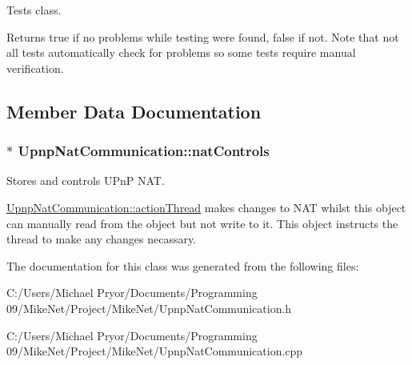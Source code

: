 Tests class. 

\begin{DoxyReturn}{Returns}
true if no problems while testing were found, false if not. Note that not all tests automatically check for problems so some tests require manual verification. 
\end{DoxyReturn}


\subsection{Member Data Documentation}
\hypertarget{class_upnp_nat_communication_a63ebeb04434bd8ed3e4d088862258d4a}{
\subsubsection[{natControls}]{$\ast$ {\bf UpnpNatCommunication::natControls}}}
\label{class_upnp_nat_communication_a63ebeb04434bd8ed3e4d088862258d4a}


Stores and controls UPnP NAT. 

\hyperlink{class_upnp_nat_communication_a3a15973c8d3f353f522cc10a7db5bb34}{UpnpNatCommunication::actionThread} makes changes to NAT whilst this object can manually read from the object but not write to it. This object instructs the thread to make any changes necassary. 

The documentation for this class was generated from the following files:\begin{DoxyCompactItemize}
\item 
C:/Users/Michael Pryor/Documents/Programming 09/MikeNet/Project/MikeNet/UpnpNatCommunication.h\item 
C:/Users/Michael Pryor/Documents/Programming 09/MikeNet/Project/MikeNet/UpnpNatCommunication.cpp\end{DoxyCompactItemize}
